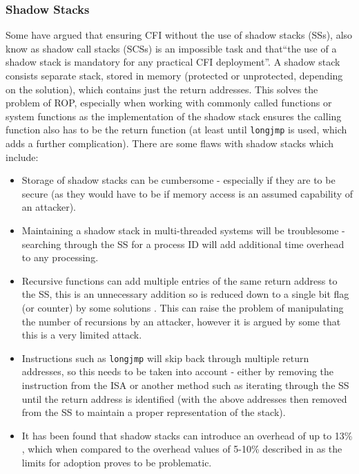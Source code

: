 \subsubsection{Shadow Stacks}
Some \cite{Christoulakis2016} have argued that ensuring CFI without the use of shadow stacks (SSs), also know as shadow call stacks (SCSs) is an impossible task and that``the use of a shadow stack is mandatory for any practical CFI deployment''. A shadow stack consists separate stack, stored in memory (protected or unprotected, depending on the solution), which contains just the return addresses. This solves the problem of ROP, especially when working with commonly called functions or system functions as the implementation of the shadow stack ensures the calling function also has to be the return function (at least until \verb|longjmp| is used, which adds a further complication). There are some flaws with shadow stacks which include:
\begin{itemize}
	\item Storage of shadow stacks can be cumbersome - especially if they are to be secure (as they would have to be if memory access is an assumed capability of an attacker).
	\item Maintaining a shadow stack in multi-threaded systems will be troublesome - searching through the SS for a process ID will add additional time overhead to any processing.
	\item Recursive functions can add multiple entries of the same return address to the SS, this is an unnecessary addition so is reduced down to a single bit flag (or counter) by some solutions \cite{Christoulakis2016}. This can raise the problem of manipulating the number of recursions by an attacker, however it is argued by some that this is a very limited attack.
\ifnotesincluded
{}
\fi


	\item Instructions such as \verb|longjmp| will skip back through multiple return addresses, so this needs to be taken into account - either by removing the instruction from the ISA or another method such as iterating through the SS until the return address is identified (with the above addresses then removed from the SS to maintain a proper representation of the stack).
	\item It has been found that shadow stacks can introduce an overhead of up to 13\% \cite{Dang}, which when compared to the overhead values of 5-10\% described in \cite{Szekeres2013} as the limits for adoption proves to be problematic.
\end{itemize}

